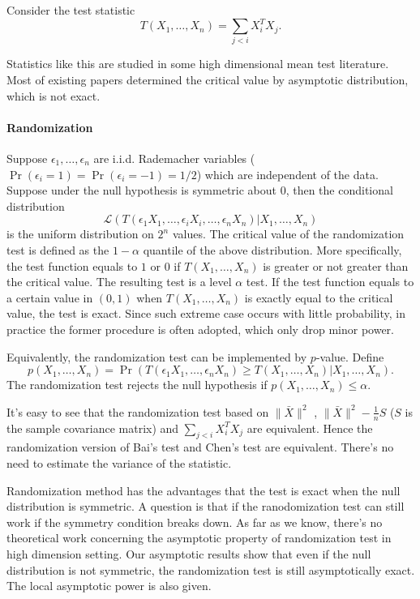 \documentclass[review]{elsarticle}
\theoremstyle{plain}
\theoremstyle{definition}
\theoremstyle{remark}
\begin{document}
Consider the test statistic 
\begin{equation}
    T(X_1,\ldots,X_n)=\sum_{j<i}X_i^TX_j.
\end{equation}

Statistics like this are studied in some high dimensional mean test literature. Most of existing papers determined the critical value by asymptotic distribution, which is not exact.

\paragraph{Randomization}
Suppose $\epsilon_1,\ldots,\epsilon_n$ are i.i.d. Rademacher variables ($\Pr(\epsilon_i=1)=\Pr(\epsilon_i=-1)=1/2$) which are independent of the data.
Suppose under the null hypothesis is symmetric about $0$, then the conditional distribution
\begin{equation*}
    \mathcal{L}(T(\epsilon_1 X_1,\ldots,\epsilon_i X_i,\ldots,\epsilon_n X_n)|X_1,\ldots,X_n)
\end{equation*}
is the uniform distribution on $2^n$ values.
The critical value of the randomization test is defined as the $1-\alpha$ quantile of the above distribution.
 More specifically, the test function equals to $1$ or $0$ if $T(X_1,\ldots, X_n)$ is greater or not greater than the critical value. The resulting test is a level $\alpha$ test.
If the test function equals to a certain value in $(0,1)$ when $T(X_1,\ldots,X_n)$ is exactly equal to the critical value,  the test is exact.
Since such extreme case occurs with little probability, in practice the former procedure is often adopted, which only drop minor power.

Equivalently, the randomization test can be implemented by $p$-value. Define 
\begin{equation*}
    p(X_1,\ldots, X_n)=
    \Pr(T(\epsilon_1 X_1,\ldots,\epsilon_n X_n)\geq T( X_1,\ldots,X_n)|X_1,\ldots,X_n).
\end{equation*}
The randomization test rejects the null hypothesis if $p(X_1,\ldots, X_n)\leq \alpha$. 



It's easy to see that the randomization test based on $\|\bar{X}\|^2$ , 
$\|\bar{X}\|^2-\frac{1}{n}S$ ($S$ is the sample covariance matrix) and $\sum_{j<i}X_i^T X_j$ are equivalent. Hence the randomization version of Bai's test and Chen's test are equivalent. There's no need to estimate the variance of the statistic.


Randomization method has the advantages that the test is exact when the null distribution is symmetric. A question is that if the ranodomization test can still work if the symmetry condition breaks down.
As far as we know, there's no theoretical work concerning the asymptotic property of randomization test in high dimension setting.
Our asymptotic results show that even if the null distribution is not symmetric, the randomization test is still asymptotically exact. 
The local asymptotic power is also given.
\end{document}

